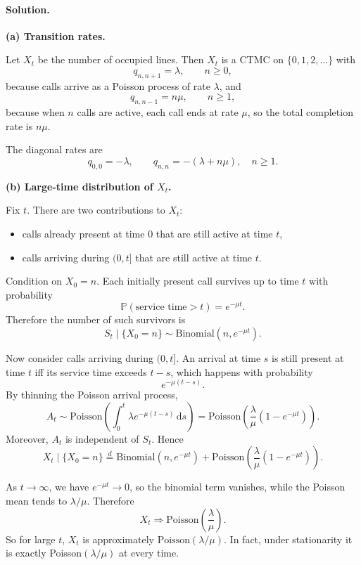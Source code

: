 \documentclass[11pt]{article}
\newcommand{\PP}{\mathbb{P}}
\newcommand{\1}{\mathbf{1}}
\newcommand{\dd}{\,\mathrm{d}}
\begin{document}
\paragraph{Solution.}
\textbf{(a) Transition rates.}

Let \(X_t\) be the number of occupied lines. Then \(X_t\) is a CTMC on \(\{0,1,2,\dots\}\) with
\[
    q_{n,n+1} = \lambda, \qquad n \ge 0,
\]
because calls arrive as a Poisson process of rate \(\lambda\), and
\[
    q_{n,n-1} = n\mu, \qquad n \ge 1,
\]
because when \(n\) calls are active, each call ends at rate \(\mu\), so the total completion rate is \(n\mu\).

The diagonal rates are
\[
    q_{0,0}=-\lambda, \qquad q_{n,n}=-(\lambda+n\mu), \quad n \ge 1.
\]

\textbf{(b) Large-time distribution of \(X_t\).}

Fix \(t\). There are two contributions to \(X_t\):
\begin{itemize}
    \item calls already present at time \(0\) that are still active at time \(t\),
    \item calls arriving during \((0,t]\) that are still active at time \(t\).
\end{itemize}

Condition on \(X_0=n\). Each initially present call survives up to time \(t\) with probability
\[
    \PP(\text{service time}>t)=e^{-\mu t}.
\]
Therefore the number of such survivors is
\[
    S_t \mid \{X_0=n\} \sim \mathrm{Binomial}(n,e^{-\mu t}).
\]

Now consider calls arriving during \((0,t]\). An arrival at time \(s\) is still present at time \(t\) iff its service time exceeds \(t-s\), which happens with probability
\[
    e^{-\mu(t-s)}.
\]
By thinning the Poisson arrival process,
\[
    A_t \sim \mathrm{Poisson}\!\left(\int_0^t \lambda e^{-\mu(t-s)} \dd s\right)
    =
    \mathrm{Poisson}\!\left(\frac{\lambda}{\mu}(1-e^{-\mu t})\right).
\]
Moreover, \(A_t\) is independent of \(S_t\). Hence
\[
    X_t \mid \{X_0=n\}
    \overset{d}{=}
    \mathrm{Binomial}(n,e^{-\mu t})
    +
    \mathrm{Poisson}\!\left(\frac{\lambda}{\mu}(1-e^{-\mu t})\right).
\]

As \(t \to \infty\), we have \(e^{-\mu t}\to 0\), so the binomial term vanishes, while the Poisson mean tends to \(\lambda/\mu\). Therefore
\[
    X_t \Longrightarrow \mathrm{Poisson}\!\left(\frac{\lambda}{\mu}\right).
\]
So for large \(t\), \(X_t\) is approximately \(\mathrm{Poisson}(\lambda/\mu)\). In fact, under stationarity it is exactly Poisson\((\lambda/\mu)\) at every time.
\end{document}
